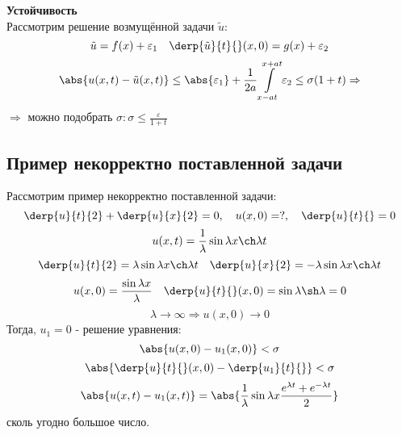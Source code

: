 \textbf{Устойчивость}\\
Рассмотрим решение возмущённой задачи $\tilde u$:
\[
	\tilde u = f(x) + \varepsilon_1 \quad \derp{\tilde u}{t}{} (x, 0) = g(x) + \varepsilon_2
\]
\[
	\abs{u(x, t) - \tilde u (x, t)} \leq \abs{\varepsilon_1} + \frac{1}{2a} \int\limits_{x - at}^{x + at} \varepsilon_2 \leq \sigma(1 + t) \Rightarrow
\]
$\Rightarrow$ можно подобрать $\sigma: \sigma \leq \frac{\varepsilon}{1 + t}$\\
		
\subsection{Пример некорректно поставленной задачи}
Рассмотрим пример некорректно поставленной задачи:\\
\[
	\derp{u}{t}{2} + \derp{u}{x}{2} = 0, \quad u(x, 0) = ?, \quad \derp{u}{t}{} = 0
\]
\[
	u(x, t) = \frac{1}{\lambda} \sin \lambda x \ch \lambda t
\]
\[
	\derp{u}{t}{2} = \lambda \sin \lambda x \ch \lambda t \quad \derp{u}{x}{2} = - \lambda \sin \lambda x \ch \lambda t
\]
\[
	u(x, 0) = \frac{\sin \lambda x}{\lambda} \quad \derp{u}{t}{} (x, 0) = \sin \lambda \sh \lambda = 0
\]
\[
	\lambda \to \infty \Rightarrow u(x, 0) \to 0
\]
Тогда, $u_1 = 0$ - решение уравнения:\\
\[
	\abs{u(x, 0)- u_1(x,0)} < \sigma
\]
\[
	\abs{\derp{u}{t}{} (x, 0) - \derp{u_1}{t}{}} < \sigma
\]
\[
	\abs{u(x, t) - u_1(x, t)} = \abs{\frac{1}{\lambda} \sin \lambda x \frac{e^{\lambda t} + e ^{- \lambda t}}{2}}
\]
сколь угодно большое число.

